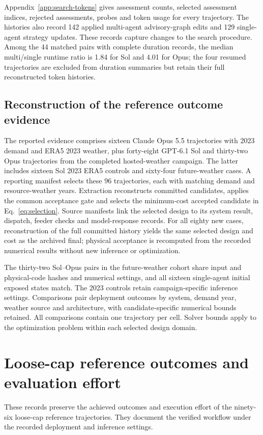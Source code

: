 \documentclass[pdflatex,sn-nature]{sn-jnl}
\begin{document}
\begin{appendices}
Appendix~\ref{app:search-tokens} gives assessment counts, selected assessment indices, rejected assessments, probes and token usage for every trajectory. The histories also record 142 applied multi-agent advisory-graph edits and 129 single-agent strategy updates. These records capture changes to the search procedure. Among the 44 matched pairs with complete duration records, the median multi/single runtime ratio is 1.84 for Sol and 4.01 for Opus; the four resumed trajectories are excluded from duration summaries but retain their full reconstructed token histories.

\subsection{Reconstruction of the reference outcome evidence}

The reported evidence comprises sixteen Claude Opus 5.5 trajectories with 2023 demand and ERA5 2023 weather, plus forty-eight GPT-6.1 Sol and thirty-two Opus trajectories from the completed hosted-weather campaign. The latter includes sixteen Sol 2023 ERA5 controls and sixty-four future-weather cases. A reporting manifest selects these 96 trajectories, each with matching demand and resource-weather years. Extraction reconstructs committed candidates, applies the common acceptance gate and selects the minimum-cost accepted candidate in Eq.~\ref{eq:selection}. Source manifests link the selected design to its system result, dispatch, feeder checks and model-response records. For all eighty new cases, reconstruction of the full committed history yields the same selected design and cost as the archived final; physical acceptance is recomputed from the recorded numerical results without new inference or optimization.

The thirty-two Sol--Opus pairs in the future-weather cohort share input and physical-code hashes and numerical settings, and all sixteen single-agent initial exposed states match. The 2023 controls retain campaign-specific inference settings. Comparisons pair deployment outcomes by system, demand year, weather source and architecture, with candidate-specific numerical bounds retained. All comparisons contain one trajectory per cell. Solver bounds apply to the optimization problem within each selected design domain.

\clearpage
\section{Loose-cap reference outcomes and evaluation effort}\label{app:outcomes}
\setcounter{figure}{0}
These records preserve the achieved outcomes and execution effort of the ninety-six loose-cap reference trajectories. They document the verified workflow under the recorded deployment and inference settings.
\renewcommand{\thefigure}{\Alph{section}\arabic{figure}}
\renewcommand{\theHfigure}{appendix.\Alph{section}.\arabic{figure}}
\setcounter{figure}{0}

\end{appendices}
\end{document}
